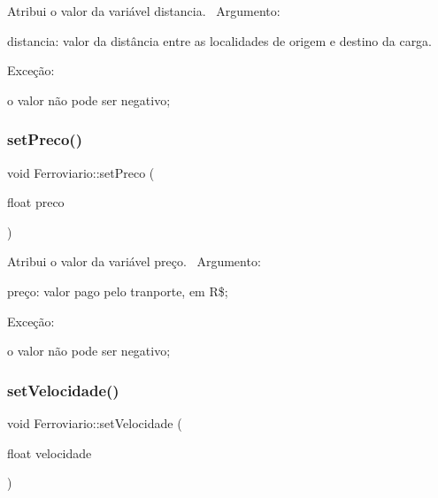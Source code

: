 Atribui o valor da variável distancia.~\newline
 Argumento\+:
\begin{DoxyItemize}
\item distancia\+: valor da distância entre as localidades de origem e destino da carga.
\end{DoxyItemize}

Exceção\+:
\begin{DoxyItemize}
\item o valor não pode ser negativo;
\end{DoxyItemize}\mbox{\label{classFerroviario_a51c231a25084ce9bef1648642196b94e}} 
\subsubsection{\texorpdfstring{set\+Preco()}{setPreco()}}
{\footnotesize\ttfamily void Ferroviario\+::set\+Preco (\begin{DoxyParamCaption}\item[{float}]{preco }\end{DoxyParamCaption})}

Atribui o valor da variável preço.~\newline
 Argumento\+:
\begin{DoxyItemize}
\item preço\+: valor pago pelo tranporte, em R\$;
\end{DoxyItemize}

Exceção\+:
\begin{DoxyItemize}
\item o valor não pode ser negativo;
\end{DoxyItemize}\mbox{\label{classFerroviario_a773bb8838b8e651c5a59a196fd3df6be}} 
\subsubsection{\texorpdfstring{set\+Velocidade()}{setVelocidade()}}
{\footnotesize\ttfamily void Ferroviario\+::set\+Velocidade (\begin{DoxyParamCaption}\item[{float}]{velocidade }\end{DoxyParamCaption})}

